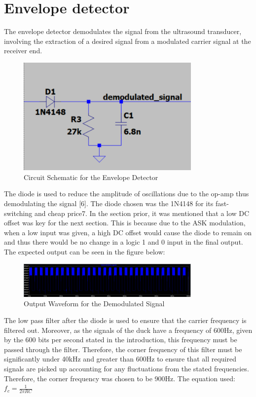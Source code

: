 \section{Envelope detector}
The envelope detector demodulates the signal from the ultrasound transducer, involving the extraction of a desired signal from a modulated carrier signal at the receiver end.
\begin{figure}[h]
    \centering
    \includegraphics[width=0.8\textwidth]{subpages/images/ultra_envelope.png}
    \caption{Circuit Schematic for the Envelope Detector}
    \label{fig:envelope_detector}
\end{figure}
The diode is used to reduce the amplitude of oscillations due to the op-amp thus demodulating the signal [6]. The diode chosen was the 1N4148 for its fast-switching and cheap price7. In the section prior, it was mentioned that a low DC offset was key for the next section. This is because due to the ASK modulation, when a low input was given, a high DC offset would cause the diode to remain on and thus there would be no change in a logic 1 and 0 input in the final output. The expected output can be seen in the figure below:
\begin{figure}[h]
    \centering
    \includegraphics[width=0.8\textwidth]{subpages/images/ultra_output_demodulated.png}
    \caption{Output Waveform for the Demodulated Signal}
    \label{fig:demodulated_waveform}
\end{figure}

The low pass filter after the diode is used to ensure that the carrier frequency is filtered out. Moreover, as the signals of the duck have a frequency of 600Hz, given by the 600 bits per second stated in the introduction, this frequency must be passed through the filter. Therefore, the corner frequency of this filter must be significantly under 40kHz and greater than 600Hz to ensure that all required signals are picked up accounting for any fluctuations from the stated frequencies. Therefore, the corner frequency was chosen to be 900Hz. The equation used: \(f_c = \frac{1}{2\pi RC}\)

